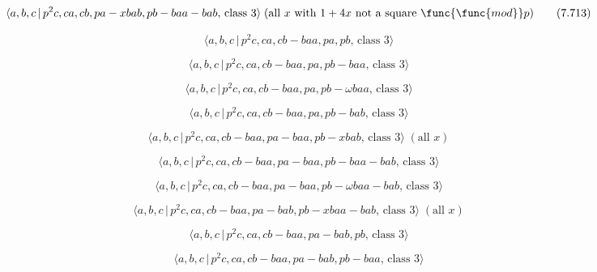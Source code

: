 \documentclass[10pt]{article}
\begin{document}
\begin{equation}
\langle a,b,c\,|\,p^2c,ca,cb,pa-xbab,pb-baa-bab,\,\text{class }3\rangle \;(%
\text{all }x\text{ with }1+4x\text{ not a square }\func{\func{mod}}p) 
\tag{7.713}
\end{equation}

\begin{equation}
\langle a,b,c\,|\,p^2c,ca,cb-baa,pa,pb,\,\text{class }3\rangle  \tag{7.714}
\end{equation}

\begin{equation}
\langle a,b,c\,|\,p^2c,ca,cb-baa,pa,pb-baa,\,\text{class }3\rangle 
\tag{7.715}
\end{equation}

\begin{equation}
\langle a,b,c\,|\,p^{2}c,ca,cb-baa,pa,pb-\omega baa,\,\text{class }3\rangle 
\tag{7.716}
\end{equation}

\begin{equation}
\langle a,b,c\,|\,p^2c,ca,cb-baa,pa,pb-bab,\,\text{class }3\rangle 
\tag{7.717}
\end{equation}

\begin{equation}
\langle a,b,c\,|\,p^2c,ca,cb-baa,pa-baa,pb-xbab,\,\text{class }3\rangle \;(%
\text{all }x)  \tag{7.718}
\end{equation}

\begin{equation}
\langle a,b,c\,|\,p^2c,ca,cb-baa,pa-baa,pb-baa-bab,\,\text{class }3\rangle 
\tag{7.719}
\end{equation}

\begin{equation}
\langle a,b,c\,|\,p^{2}c,ca,cb-baa,pa-baa,pb-\omega baa-bab,\,\text{class }%
3\rangle  \tag{7.720}
\end{equation}

\begin{equation}
\langle a,b,c\,|\,p^2c,ca,cb-baa,pa-bab,pb-xbaa-bab,\,\text{class }3\rangle
\;(\text{all }x)  \tag{7.721}
\end{equation}

\begin{equation}
\langle a,b,c\,|\,p^2c,ca,cb-baa,pa-bab,pb,\,\text{class }3\rangle 
\tag{7.722}
\end{equation}

\begin{equation}
\langle a,b,c\,|\,p^2c,ca,cb-baa,pa-bab,pb-baa,\,\text{class }3\rangle 
\tag{7.723}
\end{equation}
\end{document}
